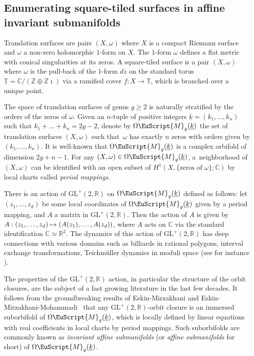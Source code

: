 \documentclass[10pt]{amsart}
\let\mathcal\EuScript
\newcommand\mto{\mathchoice{\longmapsto}{\mapsto}{\mapsto}{\mapsto}}
\theoremstyle{plain}
\theoremstyle{definition}
\newcommand{\R}{\mathbb{R}}
\def\C{\mathbb{C}}
\newcommand\Z{\mathbb{Z}}
\newcommand{\Tbb}{\mathbb{T}}
\newcommand{\Mcal}{\mathcal{M}}
\newcommand{\GL}{\mathrm{GL}}
\let\omg\omega
\let\ul\underline
\newcommand{\trate}{\Omega\Mcal_{g}(\ul{k})}
\let\Subsection\subsection\let\Subsubsection\subsubsection
\begin{document}
\Subsection{Enumerating square-tiled surfaces in affine invariant submanifolds}\label{sec:enum:sq:tiled}
Translation surfaces are pairs $(X,\omega)$ where $X$ is a compact Riemann surface and $\omega$ a non-zero holomorphic $1$-form on $X$. The $1$-form $\omg$ defines a flat metric with conical singularities at its zeros.
A square-tiled surface is a pair $(X,\omega)$ where $\omega$ is the pull-back of the $1$-form $dz$ on the standard torus $\Tbb=\C/(\Z\oplus\Z\imath)$ via a ramified cover $f: X\to \Tbb$, which is branched over a unique point.

The space of translation surfaces of genus $g\geq 2$ is naturally stratified by the orders of the zeros of $\omega$. Given an $n$-tuple of positive integers $\ul{k}=(k_1,\dots,k_n)$ such that \hbox{$k_1+\dots+k_n=2g-2$}, denote by $\trate$ the set of translation surfaces $(X,\omega)$ such that~$\omega$ has exactly $n$ zeros with orders given by $(k_1,\dots,k_n)$.
It is well-known that $\trate$ is a complex orbifold of dimension $2g+n-1$. For any $(X,\omega)\in \trate$, a~neighborhood of $(X,\omega)$ can be identified with an open subset of $H^1(X,\{\textrm{zeros of} \; \omega\}; \C)$ by local charts called \emph{period mappings}.

There is an action of $\GL^+(2,\R)$ on $\trate$ defined as follows: let $(z_1,\dots,z_d)$ be some local coordinates of $\trate$ given by a period mapping, and $A$ a matrix in $\GL^+(2,\R)$. Then the action of $A$ is given by $A: (z_1,\dots,z_d) \mto (A(z_1),\dots,A(z_d))$, where $A$ acts on $\C$ via the standard identification $\C\simeq \R^2$. The dynamics of this action of $\GL^+(2,\R)$ has deep connections with various domains such as billiards in rational polygons, interval exchange transformations, Teichmüller dynamics in moduli space (see for instance \cite{MaTa02, Zorich:survey}).

The properties of the $\GL^+(2,\R)$ action, in particular the structure of the orbit closures, are the subject of a fast growing literature in the last few decades. It follows from the groundbreaking results of Eskin-Mirzakhani \cite{EM18} and Eskin-Mirzakhani-Mohammadi~\cite{EMM15} that any $\GL^+(2,\R)$-orbit closure is an immersed suborbifold of $\trate$, which is locally defined by linear equations with real coefficients in local charts by period mappings. Such suborbifolds are commonly known as \emph{invariant affine submanifolds} (or \emph{affine submanifolds} for short) of $\trate$.
\end{document}
